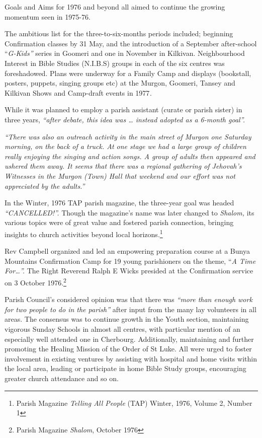 Goals and Aims for 1976 and beyond all aimed to continue the growing momentum seen in 1975-76.



The ambitious list for the three-to-six-months periods included; beginning Confirmation classes by 31 May, and the introduction of a September after-school ``\emph{G-Kids''} series in Goomeri and one in November in Kilkivan. Neighbourhood Interest in Bible Studies (N.I.B.S) groups in each of the six centres was foreshadowed. Plans were underway for a Family Camp and displays (bookstall, posters, puppets, singing groups etc) at the Murgon, Goomeri, Tansey and Kilkivan Shows and Camp-draft events in 1977\emph{.}



While it was planned to employ a parish assistant (curate or parish sister) in three years, \emph{``after debate, this idea was \ldots{} instead adopted as a 6-month goal''.}



\emph{``There was also an outreach activity in the main street of Murgon one Saturday morning, on the back of a truck. At one stage we had a large group of children really enjoying the singing and action songs. A group of adults then appeared and ushered them away. It seems that there was a regional gathering of Jehovah's Witnesses in the Murgon (Town) Hall that weekend and our effort was not appreciated by the adults.''}



In the Winter, 1976 TAP parish magazine, the three-year goal was headed \emph{``CANCELLED!''.} Though the magazine's name was later changed to \emph{Shalom,} its various topics were of great value and fostered parish connection, bringing insights to church activities beyond local horizons.\footnote{Parish Magazine \emph{Telling All People} (TAP) Winter, 1976, Volume 2, Number 1}


Rev Campbell organized and led an empowering preparation course at a Bunya Mountains Confirmation Camp for 19 young parishioners on the theme, ``\emph{A Time For\ldots''.} The Right Reverend Ralph E Wicks presided at the Confirmation service on 3 October 1976.\footnote{Parish Magazine \emph{Shalom}, October 1976}


Parish Council's considered opinion was that there was \emph{``more than enough work for two people to do in the parish''} after input from the many lay volunteers in all areas. The consensus was to continue growth in the Youth section, maintaining vigorous Sunday Schools in almost all centres, with particular mention of an especially well attended one in Cherbourg. Additionally, maintaining and further promoting the Healing Mission of the Order of St Luke. All were urged to foster involvement in existing ventures by assisting with hospital and home visits within the local area, leading or participate in home Bible Study groups, encouraging greater church attendance and so on.



